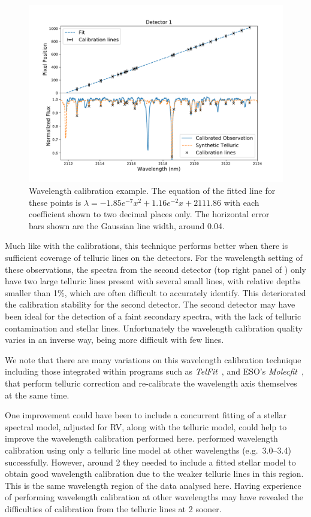 \begin{figure}
    \centering
    \includegraphics[width=0.8\linewidth]{figures/reduction/calibration.pdf}
    \caption{Wavelength calibration example.
    The equation of the fitted line for these points is $\lambda = -1.85e^{-7} x^2 + 1.16e^{-2} x + 2111.86$ with each coefficient shown to two decimal places only.
The horizontal error bars shown are the Gaussian line width, around 0.04\nm{}.}
    \label{fig:wl_calibration}
\end{figure}

Much like with the \thar{} calibrations, this technique performs better when there is sufficient coverage of telluric lines on the detectors.
For the wavelength setting of these observations, the spectra from the second detector (top right panel of ) only have two large telluric lines present with several small lines, with relative depths smaller than 1\%, which are often difficult to accurately identify.
This deteriorated the calibration stability for the second detector.
The second detector may have been ideal for the detection of a faint secondary spectra, with the lack of telluric contamination and stellar lines.
Unfortunately the wavelength calibration quality varies in an inverse way, being more difficult with few lines.

We note that there are many variations on this wavelength calibration technique including those integrated within programs such as \emph{TelFit}~\citet{gullikson_correcting_2014}, and {ESO}'s \emph{Molecfit}~\citet{smette_molecfit_2015}, that perform telluric correction and re-calibrate the wavelength axis themselves at the same time.

One improvement could have been to include a concurrent fitting of a stellar spectral model, adjusted for {RV}, along with the telluric model, could help to improve the wavelength calibration performed here. \citet{piskorz_evidence_2016} performed wavelength calibration using only a telluric line model at other \nir{} wavelengths {\red{} (e.g.\ 3.0--3.4\um{})} successfully.
However, around 2\um{} they needed to include a fitted stellar model to obtain good wavelength calibration due to the weaker telluric lines in this region.
This is the same wavelength region of the data analysed here.
Having experience of performing wavelength calibration at other wavelengths may have revealed the difficulties of calibration from the telluric lines at 2\um{} sooner.


